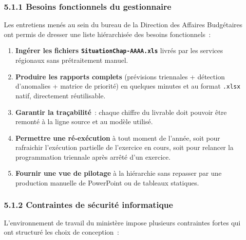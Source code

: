 \subsubsection*{5.1.1 \quad Besoins fonctionnels du gestionnaire}

Les entretiens men\'es au sein du bureau de la Direction des Affaires
Budg\'etaires ont permis de dresser une liste hi\'erarchis\'ee des besoins
fonctionnels~:

\begin{enumerate}
    \item \textbf{Ing\'erer les fichiers \texttt{SituationChap-AAAA.xls}}
    livr\'es par les services r\'egionaux sans pr\'etraitement manuel.
    \item \textbf{Produire les rapports complets} (pr\'evisions triennales
    + d\'etection d'anomalies + matrice de priorit\'e) en quelques minutes
    et au format \texttt{.xlsx} natif, directement r\'eutilisable.
    \item \textbf{Garantir la tra\c{c}abilit\'e}~: chaque chiffre du
    livrable doit pouvoir \^etre remont\'e \`a la ligne source et au
    mod\`ele utilis\'e.
    \item \textbf{Permettre une r\'e-ex\'ecution} \`a tout moment de
    l'ann\'ee, soit pour rafraichir l'ex\'ecution partielle de l'exercice
    en cours, soit pour relancer la programmation triennale apr\`es arr\^et\'e
    d'un exercice.
    \item \textbf{Fournir une vue de pilotage} \`a la hi\'erarchie sans
    repasser par une production manuelle de PowerPoint ou de tableaux
    statiques.
\end{enumerate}

\subsubsection*{5.1.2 \quad Contraintes de s\'ecurit\'e informatique}

L'environnement de travail du minist\`ere impose plusieurs contraintes
fortes qui ont structur\'e les choix de conception~:

